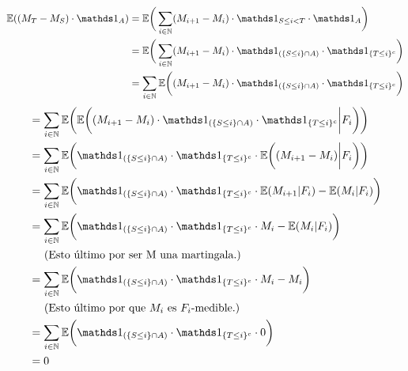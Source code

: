 	 \begin{align}
	 	\E((M_T - M_S) \cdot \indic_A)	
	 									&=		
	 	\E\bigg( \sum_{ i \in \N} ( M_{i+1} - M_i) \cdot \indic_{S \leq i < T } \cdot \indic_A \bigg)									\\
	 									&=		
	 	\E	\bigg( 
	 			\sum_{ i \in \N} 
	 				( M_{i+1} - M_i) \cdot \indic_{(\{S \leq i \} \cap A)} \cdot \indic_{\{ T \leq i \}^c} 
	 		\bigg)																														\\
	 									&=		
	 	\sum_{ i \in \N} 
	 		\E	\bigg(
	 				( M_{i+1} - M_i) \cdot \indic_{(\{S \leq i \} \cap A)} \cdot \indic_{\{ T \leq i \}^c} 
	 			\bigg)																													
	\end{align}
	\begin{align}
	 									&=		
	 	\sum_{ i \in \N} 
	 		\E	\bigg(
		 			\E	\bigg(
		 					( M_{i+1} - M_i) \cdot \indic_{(\{S \leq i \} \cap A)} \cdot \indic_{\{ T \leq i \}^c}  \bigg| F_i	
						\bigg)
	 			\bigg)																													\\
										&=
	 	\sum_{ i \in \N} 
	 		\E	\bigg(
					\indic_{(\{S \leq i \} \cap A)} \cdot \indic_{\{ T \leq i \}^c} \cdot
		 			\E	\bigg(
		 					 ( M_{i+1} - M_i)  \bigg| F_i	 												
						\bigg)
	 			\bigg)																													\\
										&=
	 	\sum_{ i \in \N} 
	 		\E	\bigg(
					\indic_{(\{S \leq i \} \cap A)} \cdot \indic_{\{ T \leq i \}^c} \cdot
		 			\E	(
		 					 M_{i+1} | F_i	 												
						)
					-
					\E	(
		 					 M_i  | F_i	 												
						)
	 			\bigg)																													\\
										&=
	 	\sum_{ i \in \N} 
	 		\E	\bigg(
					\indic_{(\{S \leq i \} \cap A)} \cdot \indic_{\{ T \leq i \}^c} \cdot
		 					 M_i
					-
					\E	(
		 					 M_i  | F_i	 												
						)
	 			\bigg)\label{problema1_4:aplicacion_de_que_M_es_martingala}																\\
										&\;\;\;\;\;\mbox{(Esto último por ser M una martingala.)}									    \\
										&=
	 	\sum_{ i \in \N} 
	 		\E	\bigg(
					\indic_{(\{S \leq i \} \cap A)} \cdot \indic_{\{ T \leq i \}^c} \cdot
		 			 M_i
						-
					 M_i
	 			\bigg)																													\\
										&\;\;\;\;\;\mbox{(Esto último por que $M_i$ es $F_i$-medible.)}								\\
										&=
		\sum_{ i \in \N} 
	 		\E	\bigg(
					\indic_{(\{S \leq i \} \cap A)} \cdot \indic_{\{ T \leq i \}^c} \cdot
		 			 0
	 			\bigg)																													\\
										&=
		0
	 \end{align}
	
